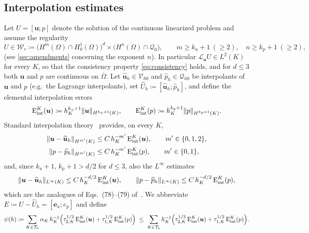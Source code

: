 \documentclass[11pt,a4paper]{article}
\newcommand{\bu}{\boldsymbol{u}}
\newcommand{\ba}{\boldsymbol{a}}
\newcommand{\beu}{\boldsymbol{e}_{u}}
\newcommand{\buhat}{\widehat{\boldsymbol{u}}_h}
\newcommand{\Th}{\mathcal{T}_h}
\DeclarePairedDelimiter{\norm}{\lVert}{\rVert}
\newcommand{\Eint}[2]{\mathrm{E}^{#1}_{\mathrm{int}}(#2)}
\theoremstyle{plain}
\theoremstyle{remark}
\theoremstyle{definition}
\numberwithin{equation}{section}
\begin{document}
\subsection{Interpolation estimates}
Let $U=[\bu;p]$ denote the solution of the continuous linearized problem and assume the
regularity
\begin{equation}\label{eq:regularity}
  U\in\mathcal{W}_r \coloneqq
  \bigl(H^{m}(\Omega)\cap H^1_0(\Omega)\bigr)^d
  \times\bigl(H^{n}(\Omega)\cap\mathcal{Q}_0\bigr),
  \qquad m\ge k_u+1\ (\ge 2),\quad n\ge k_p+1\ (\ge 2),
\end{equation}
(see \cref{sec:amendments} concerning the exponent $n$). In particular
$\mathcal{L}_{\ba}U\in L^2(K)$ for every $K$, so that the consistency property
\eqref{eq:consistency} holds, and for $d\le3$ both $\bu$ and $p$ are continuous on
$\overline{\Omega}$. Let $\buhat\in\mathcal{V}_{h0}$ and
$\widehat{p}_h\in\mathcal{Q}_{h0}$ be interpolants of $\bu$ and $p$
(e.g.\ the Lagrange interpolants), set
$\widehat{U}_h\coloneqq[\buhat;\widehat{p}_h]$, and define the elemental interpolation
errors
\begin{equation}\label{eq:Eint}
  \Eint{K}{\bu}\coloneqq h_K^{k_u+1}\norm{\bu}_{H^{k_u+1}(K)},
  \qquad
  \Eint{K}{p}\coloneqq h_K^{k_p+1}\norm{p}_{H^{k_p+1}(K)} .
\end{equation}
Standard interpolation theory~\cite{brennerscott,ernguermond} provides, on every $K$,
\begin{equation}\label{eq:interp}
\begin{aligned}
  \norm{\bu-\buhat}_{H^{m'}(K)} &\le C\,h_K^{-m'}\,\Eint{K}{\bu},
  \qquad m'\in\{0,1,2\},\\
  \norm{p-\widehat{p}_h}_{H^{m'}(K)} &\le C\,h_K^{-m'}\,\Eint{K}{p},
  \qquad m'\in\{0,1\},
\end{aligned}
\end{equation}
and, since $k_u+1,\,k_p+1>d/2$ for $d\le3$, also the $L^\infty$ estimates
\begin{equation}\label{eq:interpinfty}
  \norm{\bu-\buhat}_{L^\infty(K)} \le C\,h_K^{-d/2}\,\Eint{K}{\bu},
  \qquad
  \norm{p-\widehat{p}_h}_{L^\infty(K)} \le C\,h_K^{-d/2}\,\Eint{K}{p},
\end{equation}
which are the analogues of Eqs.~(78)--(79) of~\cite{codina2001}. We abbreviate
$E\coloneqq U-\widehat{U}_h=[\beu;e_p]$ and define
\begin{equation}\label{eq:psih}
  \psi(h)\coloneqq \sum_{K\in\Th}\alpha_K\,h_K^{-1}
  \Bigl(\tau_{2,K}^{1/2}\,\Eint{K}{\bu}+\tau_{1,K}^{1/2}\,\Eint{K}{p}\Bigr)
  \;\le\;
  \sum_{K\in\Th}h_K^{-1}
  \Bigl(\tau_{2,K}^{1/2}\,\Eint{K}{\bu}+\tau_{1,K}^{1/2}\,\Eint{K}{p}\Bigr).
\end{equation}
\end{document}
